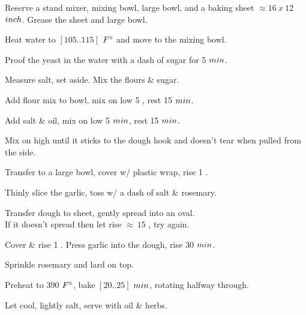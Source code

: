 \begin{preparation}
\item Reserve a stand mixer, mixing bowl, large bowl, and a baking sheet
    $\approx 16~x~12$ $\inch$.
    Grease the sheet and large bowl.
\item Heat water to $[105..115]$ $\Fahrenheit$ and move to the mixing bowl.
\item Proof the yeast in the water with a dash of sugar for 5 $\minute$.
\item Measure salt, set aside. Mix the flours \& sugar.
\item Add flour mix to bowl, mix on low 5 \minute, rest 15 $\minute$.
\item Add salt \& oil, mix on low 5 $\minute$, rest 15 $\minute$.
\item Mix on high until it sticks to the dough hook and doesn't tear when
    pulled from the side.
\item Transfer to a large bowl, cover w/ plastic wrap, rise 1 \hour.
\item Thinly slice the garlic, toss w/ a dash of salt \& rosemary.
\item Transfer dough to sheet, gently spread into an oval.\\
    If it doesn't spread then let rise $\approx~15$ \minute, try again.
\item Cover \& rise 1 \hour. Press garlic into the dough, rise 30 $\minute$.
\item Sprinkle rosemary and lard on top.
\item Preheat to 390 $\Fahrenheit$, bake $[20..25]$ $\minute$, rotating halfway through.
\item Let cool, lightly salt, serve with oil \& herbs.
\end{preparation}

\recipeend%
